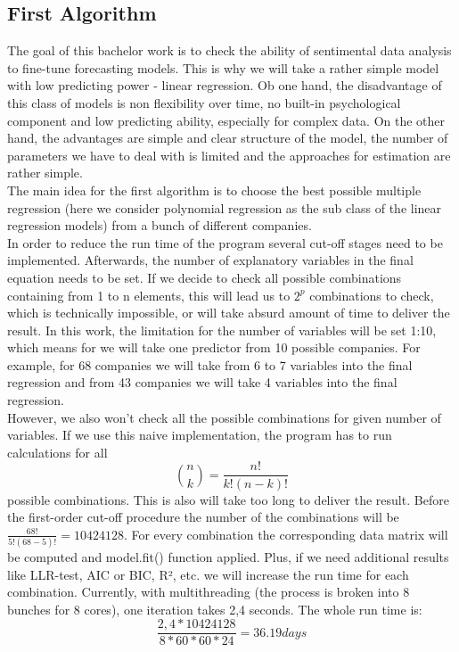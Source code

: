 \documentclass[12pt, a4paper]{article}
\begin{document}
\subsection{First Algorithm}
The goal of this bachelor work is to check the ability of sentimental data analysis to fine-tune forecasting models. This is why we will take a rather simple model with low predicting power - linear regression. Ob one hand, the disadvantage of this class of models is non flexibility over time, no built-in psychological component and low predicting ability, especially for complex data. On the other hand, the advantages are simple and clear structure of the model, the number of parameters we have to deal with is limited and the approaches for estimation are rather simple.\\
The main idea for the first algorithm is to choose the best possible multiple regression (here we consider polynomial regression as the sub class of the linear regression models) from a bunch of different companies.\\
In order to reduce the run time of the program several cut-off stages need to be implemented. Afterwards, the number of explanatory variables in the final equation needs to be set. If we decide to check all possible combinations containing from 1 to n elements, this will lead us to $2^p$ combinations to check, which is technically impossible, or will take absurd amount of time to deliver the result. In this work, the limitation for the number of variables will be set 1:10, which means for we will take one predictor from 10 possible companies. For example, for 68 companies we will take from 6 to 7 variables into the final regression and from 43 companies we will take 4 variables into the final regression.\\
However, we also won't check all the possible combinations for given number of variables. If we use this naive implementation, the program has to run calculations for all \[\binom{n}{k} = \frac{n!}{k!(n-k)!}\] possible combinations. This is also will take too long to deliver the result. Before the first-order cut-off procedure the number of the combinations will be $\frac{68!}{5!(68-5)!} = 10424128$. For every combination the corresponding data matrix will be computed and model.fit() function applied. Plus, if we need additional results like LLR-test, AIC or BIC, R², etc. we will increase the run time for each combination. Currently, with multithreading (the process is broken into 8 bunches for 8 cores), one iteration takes 2,4 seconds. The whole run time is: \[\frac{2,4*10424128}{8*60*60*24} = 36.19 days\]
\end{document}
